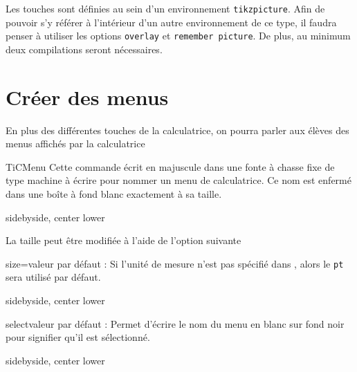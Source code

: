 \documentclass[10pt,french,a4paper]{article}
\begin{document}
Les touches sont définies au sein d'un environnement \texttt{tikzpicture}. Afin de pouvoir s'y référer à l'intérieur d'un autre environnement de ce type, il faudra penser à utiliser les options \texttt{overlay} et \texttt{remember picture}. De plus, au minimum deux compilations seront nécessaires.



\section{Créer des menus}

En plus des différentes touches de la calculatrice, on pourra parler aux élèves des menus affichés par la calculatrice

\begin{docCommand}{TiCMenu}{}
    Cette commande écrit  en majuscule dans une fonte à chasse fixe de type {\ttfamily machine à écrire} pour nommer un menu de calculatrice. Ce nom est enfermé dans une boîte à fond blanc exactement à sa taille.
\end{docCommand}

\begin{dispExample*}{sidebyside, center lower}
   
\end{dispExample*}
\medbreak

La taille peut être modifiée à l'aide de l'option suivante

\begin{docKey}{size}{=}{valeur par défaut : \docValue{15pt}}
    Si l'unité de mesure n'est pas spécifié dans , alors le \texttt{pt} sera utilisé par défaut.
\end{docKey}

\begin{dispExample*}{sidebyside, center lower}
\end{dispExample*}
\medbreak

\begin{docKey}{select}{}{valeur par défaut : }
    Permet d'écrire le nom du menu en blanc sur fond noir pour signifier qu'il est sélectionné.
\end{docKey}

\begin{dispExample*}{sidebyside, center lower}
 
\end{dispExample*}
\medbreak
\end{document}
